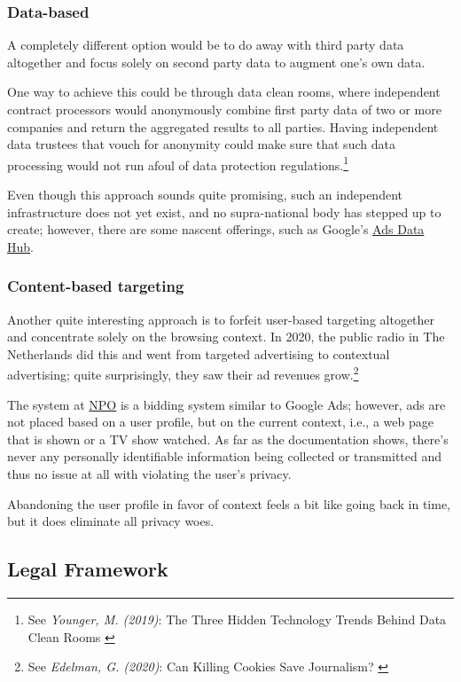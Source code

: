 \subsubsection{Data-based}

A completely different option would be to do away with third party data altogether and focus solely on second party data to augment one's own data. 

One way to achieve this could be through data clean rooms, where independent contract processors would anonymously combine first party data of two or more companies and return the aggregated results to all parties. Having independent data trustees that vouch for anonymity could make sure that such data processing would not run afoul of data protection regulations.\footnote{See \textit{Younger, M. (2019)}: The Three Hidden Technology Trends Behind Data Clean Rooms \cite{cleanRoom}}

Even though this approach sounds quite promising, such an independent infrastructure does not yet exist, and no supra-national body has stepped up to create; however, there are some nascent offerings, such as Google's \href{https://developers.google.com/ads-data-hub}{Ads Data Hub}.

\subsubsection{Content-based targeting}

Another quite interesting approach is to forfeit user-based targeting altogether and concentrate solely on the browsing context. In 2020, the public radio in The Netherlands did this and went from targeted advertising to contextual advertising; quite surprisingly, they saw their ad revenues grow.\footnote{See \textit{Edelman, G. (2020)}: Can Killing Cookies Save Journalism? \cite{killingCookies}} 

The system at \href{https://over.npo.nl/}{NPO} is a bidding system similar to Google Ads; however, ads are not placed based on a user profile, but on the current context, i.e., a web page that is shown or a TV show watched. As far as the documentation shows, there's never any personally identifiable information being collected or transmitted and thus no issue at all with violating the user's privacy.

Abandoning the user profile in favor of context feels a bit like going back in time, but it does eliminate all privacy woes.

\subsection{Legal Framework}

